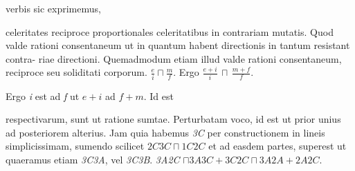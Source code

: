 %
verbis sic exprimemus,
%
\rule[0cm]{0mm}{10pt}%
celeritates  reciproce proportionales celeritatibus 
%
in contrariam mutatis.%
%
Quod valde rationi consentaneum ut in quantum habent directionis in tantum resistant contra-
\pend
\newpage
\pstart
\noindent
riae
directioni. Quemadmodum etiam illud valde rationi consentaneum,
%
reciproce 
%
seu soliditati corporum. 
\pend 
\pstart
%
$\displaystyle\frac{e}{i} \sqcap \displaystyle\frac{m}{f}$.
%
Ergo 
%
$\displaystyle\frac{e+i}{i}\, \sqcap\, \displaystyle\frac{m+f}{f}$.
%
\rule[0cm]{0mm}{16pt}%
Ergo \textit{i} est ad \textit{f} ut 
$e+i$ ad $f+m$. Id est
%
%
\rule[0cm]{0mm}{10pt}%
respectivarum, sunt ut 
%
%
ratione\protect{} sumtae. Perturbatam voco, id est ut prior unius ad posteriorem alterius. 
\pend\pstart
%
Jam quia habemus \textit{{\scriptsize 3}C} per constructionem in lineis simplicissimam\protect{}, sumendo scilicet ${\scriptstyle \textit{2}}C{\scriptstyle \textit{3}}C \sqcap {\scriptstyle \textit{1}}C{\scriptstyle \textit{2}}C$ et ad easdem partes, superest
ut quaeramus etiam \textit{{\scriptsize 3}C{\scriptsize 3}A}, vel 
%
\textit{{\scriptsize 3}C{\scriptsize 3}B}. \textit{{\scriptsize 3}A{\scriptsize 2}C} 
%
$\sqcap {\scriptstyle \textit{3}}A{\scriptstyle \textit{3}}C+{\scriptstyle \textit{3}}C{\scriptstyle \textit{2}}C \sqcap {\scriptstyle \textit{3}}A{\scriptstyle \textit{2}}A+{\scriptstyle \textit{2}}A{\scriptstyle \textit{2}}C$.
